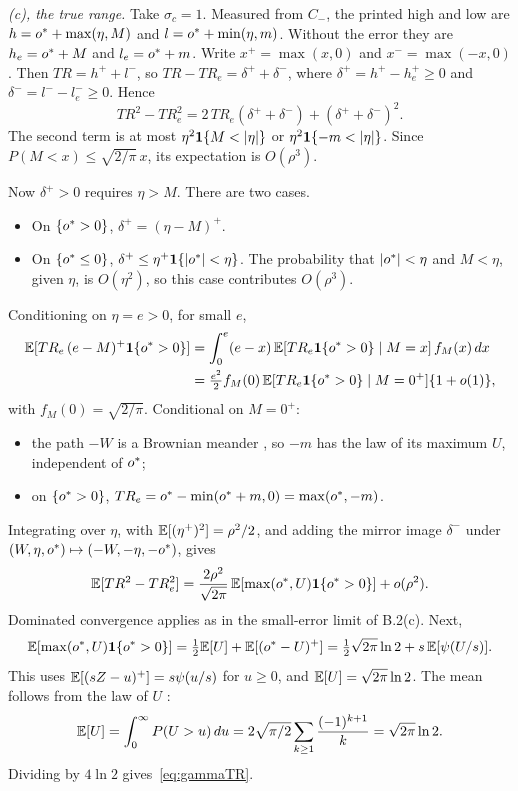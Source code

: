 \emph{(c), the true range.} Take $\sigma_c=1$. Measured from $C_{-}$, the printed high and low are
$h={o^{*}}+\max(\eta,M)$ and $l={o^{*}}+\min(\eta,m)$. Without the error they are $h_e={o^{*}}+M$ and
$l_e={o^{*}}+m$. Write $x^+=\max(x,0)$ and $x^-=\max(-x,0)$. Then $TR=h^++l^-$, so
$TR-TR_e=\delta^++\delta^-$, where $\delta^+=h^+-h_e^+\ge0$ and $\delta^-=l^--l_e^-\ge0$. Hence
\[
  TR^2-TR_e^2=2\,TR_e(\delta^++\delta^-)+(\delta^++\delta^-)^2.
\]
The second term is at most $\eta^2\ind\{M<|\eta|\}$ or $\eta^2\ind\{-m<|\eta|\}$. Since
$P(M<x)\le\sqrt{2/\pi}\,x$, its expectation is $O(\rho^3)$.

Now $\delta^+>0$ requires $\eta>M$. There are two cases.
\begin{itemize}
  \item On $\{{o^{*}}>0\}$, $\delta^+=(\eta-M)^+$.
  \item On $\{{o^{*}}\le0\}$, $\delta^+\le\eta^+\mathbf{1}\{|{o^{*}}|<\eta\}$. The probability that $|{o^{*}}|<\eta$
        and $M<\eta$, given $\eta$, is $O(\eta^2)$, so this case contributes $O(\rho^3)$.
\end{itemize}
Conditioning on $\eta=e>0$, for small $e$,
\begin{align*}
  \mathbb{E}[TR_e\,(e-M)^+\mathbf{1}\{{o^{*}}>0\}]&=\int_0^e(e-x)\,\mathbb{E}[TR_e\mathbf{1}\{{o^{*}}>0\}\mid M=x]\,f_M(x)\,dx\\
  &=\tfrac{e^2}{2}f_M(0)\,\mathbb{E}[TR_e\mathbf{1}\{{o^{*}}>0\}\mid M=0^+]\{1+o(1)\},
\end{align*}
with $f_M(0)=\sqrt{2/\pi}$. Conditional on $M=0^+$:
\begin{itemize}
  \item the path $-W$ is a Brownian meander \citep{DurrettIglehartMiller1977}, so $-m$ has the law
        of its maximum $U$, independent of ${o^{*}}$;
  \item on $\{{o^{*}}>0\}$, $TR_e={o^{*}}-\min({o^{*}}+m,0)=\max({o^{*}},-m)$.
\end{itemize}
Integrating over $\eta$, with $\mathbb{E}[(\eta^+)^2]=\rho^2/2$, and adding the mirror image $\delta^-$
under $(W,\eta,{o^{*}})\mapsto(-W,-\eta,-{o^{*}})$, gives
\[
  \mathbb{E}[TR^2-TR_e^2]=\frac{2\rho^2}{\sqrt{2\pi}}\,\mathbb{E}[\max({o^{*}},U)\mathbf{1}\{{o^{*}}>0\}]+o(\rho^2).
\]
Dominated convergence applies as in the small-error limit of B.2(c). Next,
\[
  \mathbb{E}[\max({o^{*}},U)\mathbf{1}\{{o^{*}}>0\}]=\tfrac12\mathbb{E}[U]+\mathbb{E}[({o^{*}}-U)^+]=\tfrac12\sqrt{2\pi}\ln2+s\,\mathbb{E}[\psi(U/s)].
\]
This uses $\mathbb{E}[(sZ-u)^+]=s\psi(u/s)$ for $u\ge0$, and $\mathbb{E}[U]=\sqrt{2\pi}\ln2$. The mean follows from
the law of $U$ \citep{DurrettIglehart1977}:
\[
  \mathbb{E}[U]=\int_0^\infty P(U>u)\,du=2\sqrt{\pi/2}\sum_{k\ge1}\frac{(-1)^{k+1}}{k}=\sqrt{2\pi}\ln2.
\]
Dividing by $4\ln2$ gives~\eqref{eq:gammaTR}.

